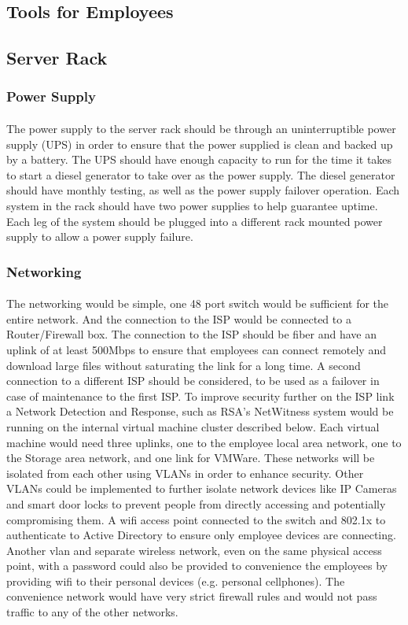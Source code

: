 \documentclass{article}
\begin{document}
\subsection{Tools for Employees} 
\subsection{Server Rack}
\subsubsection{Power Supply} \paragraph{} The power supply to the server rack should be through an uninterruptible power supply (UPS) in order to ensure that the power supplied is clean and backed up by a battery.
The UPS should have enough capacity to run for the time it takes to start a diesel generator to take over as the power supply.
The diesel generator should have monthly testing, as well as the power supply failover operation.
Each system in the rack should have two power supplies to help guarantee uptime.
Each leg of the system should be plugged into a different rack mounted power supply to allow a power supply failure.
 
\subsubsection{Networking} \paragraph{} The networking would be simple, one 48 port switch would be sufficient for the entire network.
And the connection to the ISP would be connected to a Router/Firewall box.
The connection to the ISP should be fiber and have an uplink of at least 500Mbps to ensure that employees can connect remotely and download large files without saturating the link for a long time.
A second connection to a different ISP should be considered, to be used as a failover in case of maintenance to the first ISP.
To improve security further on the ISP link a Network Detection and Response, such as RSA's NetWitness system would be running on the internal virtual machine cluster described below.
Each virtual machine would need three uplinks, one to the employee local area network, one to the Storage area network, and one link for VMWare.
These networks will be isolated from each other using VLANs in order to enhance security.
Other VLANs could be implemented to further isolate network devices like IP Cameras and smart door locks to prevent people from directly accessing and potentially compromising them.
A wifi access point connected to the switch and 802.1x to authenticate to Active Directory to ensure only employee devices are connecting.
Another vlan and separate wireless network, even on the same physical access point, with a password could also be provided to convenience the employees by providing wifi to their personal devices (e.g. personal cellphones).
The convenience network would have very strict firewall rules and would not pass traffic to any of the other networks.
\end{document}
